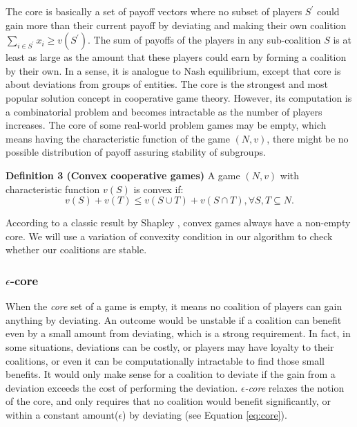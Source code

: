\documentclass[10pt,journal,cspaper,compsoc]{IEEEtran}
\begin{document}
The core is basically a set of payoff vectors where no subset of
players $S^\prime$ could gain more than their current payoff by
deviating and making their own coalition $\sum_{i \in S^\prime}
x_i \geq v(S^\prime)$. The sum of payoffs of the players in any
sub-coalition $S$ is at least as large as the amount that these
players could earn by forming a coalition by their own. In a
sense, it is analogue to Nash equilibrium, except that core is
about deviations from groups of entities. The core is the
strongest and most popular solution concept in cooperative game
theory. However, its computation is a combinatorial problem and
becomes intractable as the number of players increases. The core
of some real-world problem games may be empty, which means having
the characteristic function of the game $(N,v)$, there might be no
possible distribution of payoff assuring stability of subgroups.

{\bf Definition 3 (Convex cooperative games)} A game $(N,v)$ with
characteristic function $v(S)$ is convex if:
\begin{equation}\label{eq:convex}
v(S) + v(T) \leq v(S \cup T) + v (S \cap T), \forall S,T \subseteq
N.
\end{equation}

According to a classic result by Shapley \cite{S1971cores}, convex
games always have a non-empty core. We will use a variation of
convexity condition in our algorithm to check whether our
coalitions are stable.

\subsubsection*{$\epsilon$-core}\label{s:epsilon}
When the \emph{core} set of a game is empty, it means no coalition
of players can gain anything by deviating. An outcome would be
unstable if a coalition can benefit even by a small amount from
deviating, which is a strong requirement. In fact, in some
situations, deviations can be costly, or players may have loyalty
to their coalitions, or even it can be computationally intractable
to find those small benefits. It would only make sense for a
coalition to deviate if the gain from a deviation exceeds the cost
of performing the deviation. \emph{$\epsilon$-core} relaxes the
notion of the core, and only requires that no coalition would
benefit significantly, or within a constant amount($\epsilon$) by
deviating (see Equation \ref{eq:core}).
\end{document}
